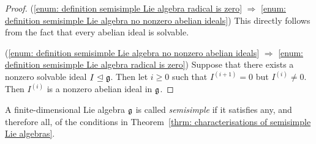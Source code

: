 \begin{proof}
 (\ref{enum: definition semisimple Lie algebra radical is zero} $\Rightarrow$ \ref{enum: definition semisimple Lie algebra no nonzero abelian ideals}) This directly follows from the fact that every abelian ideal is solvable.
 
 (\ref{enum: definition semisimple Lie algebra no nonzero abelian ideals} $\Rightarrow$ \ref{enum: definition semisimple Lie algebra radical is zero}) Suppose that there exists a nonzero solvable ideal $I \trianglelefteq \mathfrak{g}$. Then let $i \geq 0$ such that $I^{(i+1)} = 0$ but $I^{(i)} \neq 0$. Then $I^{(i)}$ is a nonzero abelian ideal in $\mathfrak{g}$.
\end{proof}



\begin{defi}
 A finite-dimensional Lie algebra $\mathfrak{g}$ is called \emph{semisimple} if it satisfies any, and therefore all, of the conditions in Theorem~\ref{thrm: characterisations of semisimple Lie algebras}.
\end{defi}
